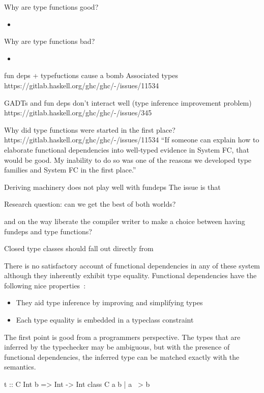 \documentclass[screen,nonacm,manuscript,review]{acmart} %
\begin{document}
Why are type functions good?
\begin{itemize}
\item
\end{itemize}

Why are type functions bad?
\begin{itemize}
\item
\end{itemize}

fun deps + typefuctions cause a bomb
Associated types https://gitlab.haskell.org/ghc/ghc/-/issues/11534

GADTs and fun deps don't interact well (type inference improvement problem)
https://gitlab.haskell.org/ghc/ghc/-/issues/345

Why did type functions were started in the first place?
https://gitlab.haskell.org/ghc/ghc/-/issues/11534
``If someone can explain how to elaborate functional dependencies into well-typed evidence in System FC, that would be good. My inability to do so was one of the reasons we developed type families and System FC in the first place.''

Deriving machinery does not play well with fundeps
The issue is that

Research question:
can we get the best of both worlds?

and on the way liberate the compiler writer to make a choice between
having fundeps and type functions?

Closed type classes should fall out directly from


There is no satisfactory account of functional
dependencies in any of these system although they inherently exhibit
type equality. Functional dependencies have the following nice
properties~\cite{jones_simplifying_1995}:
\begin{itemize}
\item They aid type inference by improving and simplifying types
\item Each type equality is embedded in a typeclass constraint
\end{itemize}

The first point is good from a programmers perspective. The types that
are inferred by the typechecker may be ambiguous, but with the presence of
functional dependencies, the inferred type can be matched exactly with
the semantics.

\begin{code}
  t :: C Int b => Int -> Int
  class C a b | a ~> b
\end{code}
\end{document}
